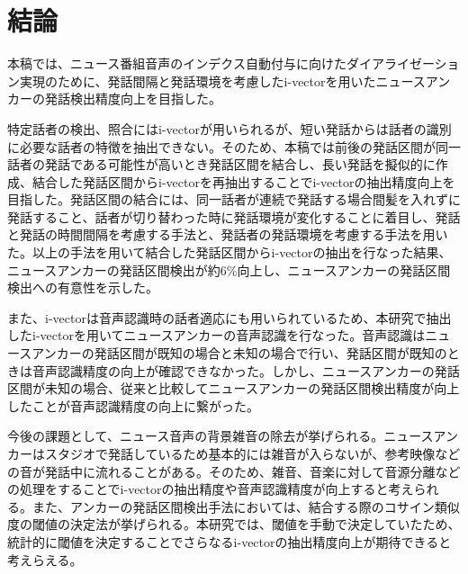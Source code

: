 \chapter{結論}
本稿では、ニュース番組音声のインデクス自動付与に向けたダイアライゼーション実現のために、発話間隔と発話環境を考慮したi-vectorを用いたニュースアンカーの発話検出精度向上を目指した。\par
特定話者の検出、照合にはi-vectorが用いられるが、短い発話からは話者の識別に必要な話者の特徴を抽出できない。そのため、本稿では前後の発話区間が同一話者の発話である可能性が高いとき発話区間を結合し、長い発話を擬似的に作成、結合した発話区間からi-vectorを再抽出することでi-vectorの抽出精度向上を目指した。発話区間の結合には、同一話者が連続で発話する場合間髪を入れずに発話すること、話者が切り替わった時に発話環境が変化することに着目し、発話と発話の時間間隔を考慮する手法と、発話者の発話環境を考慮する手法を用いた。以上の手法を用いて結合した発話区間からi-vectorの抽出を行なった結果、ニュースアンカーの発話区間検出が約6\%向上し、ニュースアンカーの発話区間検出への有意性を示した。\par
また、i-vectorは音声認識時の話者適応にも用いられているため、本研究で抽出したi-vectorを用いてニュースアンカーの音声認識を行なった。音声認識はニュースアンカーの発話区間が既知の場合と未知の場合で行い、発話区間が既知のときは音声認識精度の向上が確認できなかった。しかし、ニュースアンカーの発話区間が未知の場合、従来と比較してニュースアンカーの発話区間検出精度が向上したことが音声認識精度の向上に繋がった。\par
今後の課題として、ニュース音声の背景雑音の除去が挙げられる。ニュースアンカーはスタジオで発話しているため基本的には雑音が入らないが、参考映像などの音が発話中に流れることがある。そのため、雑音、音楽に対して音源分離などの処理をすることでi-vectorの抽出精度や音声認識精度が向上すると考えられる。また、アンカーの発話区間検出手法においては、結合する際のコサイン類似度の閾値の決定法が挙げられる。本研究では、閾値を手動で決定していたため、統計的に閾値を決定することでさらなるi-vectorの抽出精度向上が期待できると考えらえる。